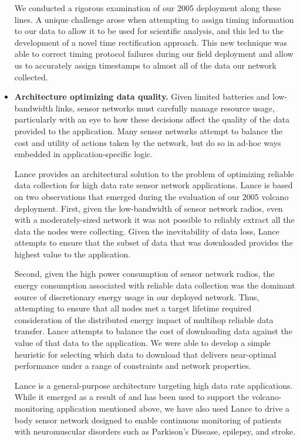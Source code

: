 \begin{itemize}
We conducted a rigorous examination of our 2005 deployment along these lines.
A unique challenge arose when attempting to assign timing information to our
data to allow it to be used for scientific analysis, and this led to the
development of a novel time rectification approach. This new technique was
able to correct timing protocol failures during our field deployment and
allow us to accurately assign timestamps to almost all of the data our
network collected.


\item \textbf{Architecture optimizing data quality.} Given limited batteries
and low-bandwidth links, sensor networks must carefully manage resource
usage, particularly with an eye to how these decisions affect the quality of
the data provided to the application. Many sensor networks attempt to balance
the cost and utility of actions taken by the network, but do so in ad-hoc
ways embedded in application-specific logic.

Lance provides an architectural solution to the problem of optimizing
reliable data collection for high data rate sensor network applications.
Lance is based on two observations that emerged during the evaluation of our
2005 volcano deployment. First, given the low-bandwidth of sensor network
radios, even with a moderately-sized network it was not possible to reliably
extract all the data the nodes were collecting. Given the inevitability of
data loss, Lance attempts to ensure that the subset of data that was
downloaded provides the highest value to the application.

Second, given the high power consumption of sensor network radios, the energy
consumption associated with reliable data collection was the dominant source
of discretionary energy usage in our deployed network. Thus, attempting to
ensure that all nodes met a target lifetime required consideration of the
distributed energy impact of multihop reliable data transfer. Lance attempts
to balance the cost of downloading data against the value of that data to the
application. We were able to develop a simple heuristic for selecting which
data to download that delivers near-optimal performance under a range of
constraints and network properties.

Lance is a general-purpose architecture targeting high data rate
applications. While it emerged as a result of and has been used to support
the volcano-monitoring application mentioned above, we have also used Lance
to drive a body sensor network designed to enable continuous monitoring of
patients with neuromuscular disorders such as Parkison's Disease, epilepsy,
and stroke.


\end{itemize}
